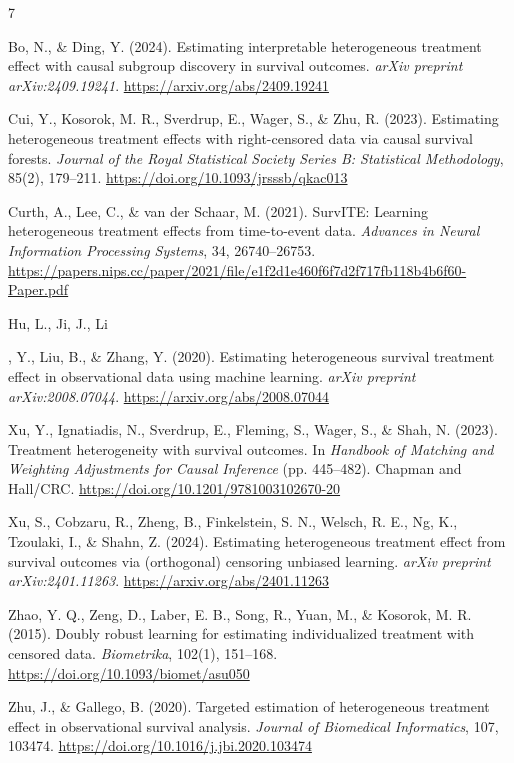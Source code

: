 \documentclass{article}
\begin{document}

\begin{thebibliography}{7}

Bo, N., \& Ding, Y. (2024). Estimating interpretable heterogeneous treatment effect with causal subgroup discovery in survival outcomes. \emph{arXiv preprint arXiv:2409.19241}. \url{https://arxiv.org/abs/2409.19241}

Cui, Y., Kosorok, M. R., Sverdrup, E., Wager, S., \& Zhu, R. (2023). Estimating heterogeneous treatment effects with right-censored data via causal survival forests. \emph{Journal of the Royal Statistical Society Series B: Statistical Methodology}, 85(2), 179--211. \url{https://doi.org/10.1093/jrsssb/qkac013}

Curth, A., Lee, C., \& van der Schaar, M. (2021). SurvITE: Learning heterogeneous treatment effects from time-to-event data. \emph{Advances in Neural Information Processing Systems}, 34, 26740--26753. \url{https://papers.nips.cc/paper/2021/file/e1f2d1e460f6f7d2f717fb118b4b6f60-Paper.pdf}

Hu, L., Ji, J., Li

, Y., Liu, B., \& Zhang, Y. (2020). Estimating heterogeneous survival treatment effect in observational data using machine learning. \emph{arXiv preprint arXiv:2008.07044}. \url{https://arxiv.org/abs/2008.07044}

Xu, Y., Ignatiadis, N., Sverdrup, E., Fleming, S., Wager, S., \& Shah, N. (2023). Treatment heterogeneity with survival outcomes. In \emph{Handbook of Matching and Weighting Adjustments for Causal Inference} (pp. 445--482). Chapman and Hall/CRC. \url{https://doi.org/10.1201/9781003102670-20}

Xu, S., Cobzaru, R., Zheng, B., Finkelstein, S. N., Welsch, R. E., Ng, K., Tzoulaki, I., \& Shahn, Z. (2024). Estimating heterogeneous treatment effect from survival outcomes via (orthogonal) censoring unbiased learning. \emph{arXiv preprint arXiv:2401.11263}. \url{https://arxiv.org/abs/2401.11263}

Zhao, Y. Q., Zeng, D., Laber, E. B., Song, R., Yuan, M., \& Kosorok, M. R. (2015). Doubly robust learning for estimating individualized treatment with censored data. \emph{Biometrika}, 102(1), 151--168. \url{https://doi.org/10.1093/biomet/asu050}

Zhu, J., \& Gallego, B. (2020). Targeted estimation of heterogeneous treatment effect in observational survival analysis. \emph{Journal of Biomedical Informatics}, 107, 103474. \url{https://doi.org/10.1016/j.jbi.2020.103474}

\end{thebibliography}
\end{document}
